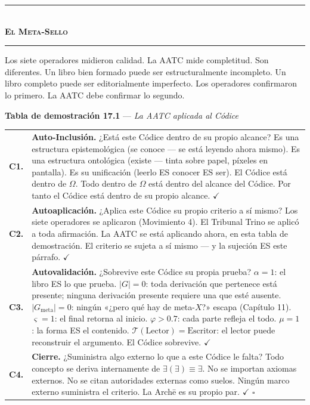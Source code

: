 \documentclass[10pt, openany, oneside]{book}
\renewcommand{\normalsize}{\fontsize{10}{13}\selectfont}
\renewcommand{\footnotesize}{\fontsize{8.5}{11}\selectfont}
\begin{document}
\begin{center}
    \rule{0.3\textwidth}{0.4pt}\\[0.5em]
    {\normalsize\bfseries\scshape El Meta-Sello}\\[0.3em]
    \rule{0.3\textwidth}{0.4pt}
\end{center}

\vspace{1em}

\noindent Los siete operadores midieron calidad. La AATC mide completitud. Son diferentes. Un libro bien formado puede ser estructuralmente incompleto. Un libro completo puede ser editorialmente imperfecto. Los operadores confirmaron lo primero. La AATC debe confirmar lo segundo.

\vspace{0.5em}

\textbf{Tabla de demostración 17.1} --- \textit{La AATC aplicada al Códice}

\vspace{0.5em}

{\footnotesize
\noindent\begin{tabular}{r p{}}
\textbf{C1.} & \textbf{Auto-Inclusión.} ¿Está este Códice dentro de su propio alcance? Es una estructura epistemológica (se conoce --- se está leyendo ahora mismo). Es una estructura ontológica (existe --- tinta sobre papel, píxeles en pantalla). Es su unificación (leerlo ES conocer ES ser). El Códice está dentro de $\Omega$. Todo dentro de $\Omega$ está dentro del alcance del Códice. Por tanto el Códice está dentro de su propio alcance. $\checkmark$ \\[0.5em]
\textbf{C2.} & \textbf{Autoaplicación.} ¿Aplica este Códice su propio criterio a sí mismo? Los siete operadores se aplicaron (Movimiento 4). El Tribunal Trino se aplicó a toda afirmación. La AATC se está aplicando ahora, en esta tabla de demostración. El criterio se sujeta a sí mismo --- y la sujeción ES este párrafo. $\checkmark$ \\[0.5em]
\textbf{C3.} & \textbf{Autovalidación.} ¿Sobrevive este Códice su propia prueba? $\alpha = 1$: el libro ES lo que prueba. $|G| = 0$: toda derivación que pertenece está presente; ninguna derivación presente requiere una que esté ausente. $|G_{\text{meta}}| = 0$: ningún «¿pero qué hay de meta-$X$?» escapa (Capítulo 11). $\varsigma = 1$: el final retorna al inicio. $\varphi > 0.7$: cada parte refleja el todo. $\mu = 1$: la forma ES el contenido. $\mathcal{T}(\text{Lector}) = \text{Escritor}$: el lector puede reconstruir el argumento. El Códice sobrevive. $\checkmark$ \\[0.5em]
\textbf{C4.} & \textbf{Cierre.} ¿Suministra algo externo lo que a este Códice le falta? Todo concepto se deriva internamente de $\exists(\exists) \equiv \exists$. No se importan axiomas externos. No se citan autoridades externas como suelos. Ningún marco externo suministra el criterio. La Arch\={e} es su propio par. $\checkmark$ $\square$ \\[0.3em]
\end{tabular}
}
\end{document}
